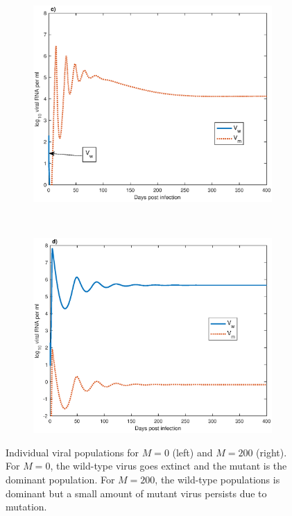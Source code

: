\documentclass[11pt, oneside]{article}    %
\begin{document}
\begin{figure}[h]
    \centering
    \begin{subfigure}[b]{0.5\textwidth}
        \centering
        \includegraphics[scale=0.55]{ind_no_M.eps}
    \end{subfigure}%
    ~ 
    \begin{subfigure}[b]{0.5\textwidth}
        \centering
        \includegraphics[scale=0.55]{ind_with_M.eps}
    \end{subfigure}
    \caption{Individual viral populations for $M=0$ (left) and $M=200$ (right). For $M=0$, the wild-type virus goes extinct and the mutant is the dominant population. For $M=200$, the wild-type populations is dominant but a small amount of mutant virus persists due to mutation.}
\label{fig:indv_sim}
\end{figure}
\end{document}
